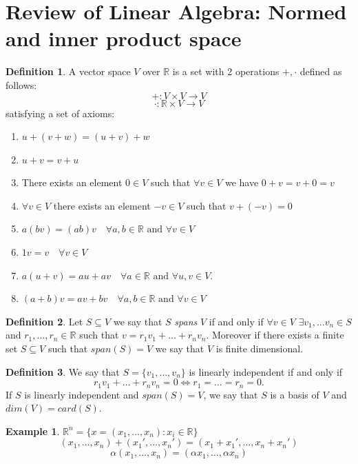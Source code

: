 \documentclass[11pt,openany]{book}
\theoremstyle{plain}
\theoremstyle{definition}
\newtheorem{definition}{Definition}[chapter]
\newtheorem{example}{Example}[chapter]
\theoremstyle{remark}
\newcommand{\R}{\mathbb{R}}
\begin{document}
\section{Review of Linear Algebra: Normed and inner product space}
\begin{definition}
    A vector space $V$ over $\R$ is a set with 2 operations $+, \cdot$ defined as follows: \[
+ : V\times V \to V
\]
\[
\cdot : \R \times V \to V
\]
satisfying a set of axioms: \begin{enumerate}
    \item $u+(v+w) = (u+v)+w $
    \item $u+v = v+u$
    \item There exists an element $0 \in V$ such that $\forall v \in V$ we have $0+v = v+0 = v$
    \item $\forall v \in V$ there exists an element $-v \in V$ such that $v + (-v) = 0$
    \item $a(bv) = (ab)v  \quad \forall a,b \in \R \text{ and } \forall v \in V$
    \item $1v = v \quad \forall v \in V$
    \item $a(u+v) = au+av  \quad \forall a \in \R \text{ and } \forall u,v\in V.$
    \item $(a+b)v = av+bv\quad \forall a,b \in \R \text{ and } \forall v\in V$
\end{enumerate}
\end{definition}
\begin{definition}
    Let $S \subseteq V$ we say that $S$ \emph{spans} $V$ if and only if $\forall v \in V$ $\exists v_1, \dots v_n \in S$ and $r_1,\dots, r_n\in \R$ such that $v = r_1v_1+\dots +r_nv_n$. Moreover if there exists a finite set $S \subseteq V$ such that $span(S) = V$ we say that $V$ is finite dimensional.
\end{definition}
\begin{definition}
     We say that $S = \{v_1,\dots,v_n\}$ is linearly independent if and only if \[r_1v_1 + \dots + r_nv_n = 0 \iff r_1 = \dots =r_n=0.\] If $S$ is linearly independent and $span(S) = V$, we say that $S$ is a basis of $V$ and $dim(V) = card(S)$.
\end{definition}
\begin{example}
    $\R^n = \{x= (x_1, \dots ,x_n) : x_i \in \R\}$
    \[
    (x_1,\dots,x_n)+(x_1',\dots ,x_n') = (x_1+x_1', \dots , x_n+x_n')
    \]
    \[
    \alpha(x_1, \dots ,x_n) = (\alpha x_1, \dots, \alpha x_n)
    \]
\end{example}
\end{document}
